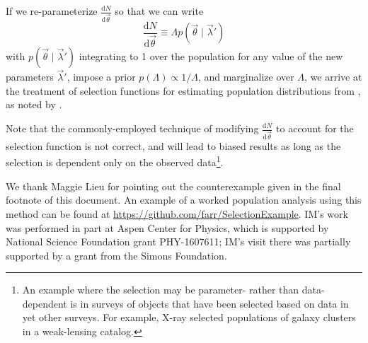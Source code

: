 \documentclass[modern]{aastex62}
\newcommand{\dd}{\mathrm{d}}
\newcommand{\diff}[2]{\frac{\dd #1}{\dd #2}}
\newcommand{\vlambda}{\vec{\lambda}}
\newcommand{\vtheta}{\vec{\theta}}
\begin{document}
If we re-parameterize $\diff{N}{\vtheta}$ so that we can write
%
\begin{equation}
  \diff{N}{\vtheta} \equiv \Lambda p\left( \vtheta \mid \vlambda{}' \right)
\end{equation}
%
with $p\left( \vtheta \mid \vlambda{}'\right)$ integrating to 1 over the
population for any value of the new parameters $\vlambda{}'$, impose a prior
$p\left( \Lambda \right)\propto 1/\Lambda$, and marginalize over $\Lambda$, we
arrive at the treatment of selection functions for estimating population
distributions from \citet{Loredo2004,O1-BBH,Mandel2016}, as noted by
\citet{Fishbach2018}.

Note that the commonly-employed technique of modifying $\diff{N}{\vtheta}$ to
account for the selection function is not correct, and will lead to biased
results as long as the selection is dependent only on the observed
data\footnote{An example where the selection may be parameter- rather than
data-dependent is in surveys of objects that have been selected based on data in
yet other surveys.  For example, X-ray selected populations of galaxy clusters
in a weak-lensing catalog.}.

\acknowledgments

We thank Maggie Lieu for pointing out the counterexample given in the final
footnote of this document.  An example of a worked population analysis using
this method can be found at \url{https://github.com/farr/SelectionExample}.
IM's work was performed in part at Aspen Center for Physics, which is supported
by National Science Foundation grant PHY-1607611; IM's visit there was partially
supported by a grant from the Simons Foundation.

\newpage


\end{document}
